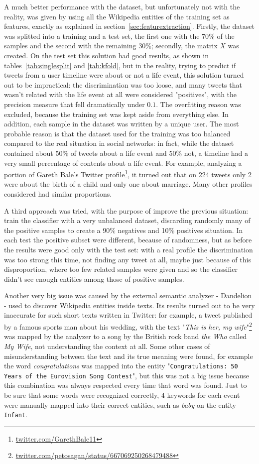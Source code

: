 A much better performance with the dataset, but unfortunately not with the reality, was given by using all the Wikipedia entities of the training set as features, exactly as explained in section~\ref{sec:featurextraction}. Firstly, the dataset was splitted into a training and a test set, the first one with the 70\% of the samples and the second with the remaining 30\%; secondly, the matrix $X$ was created. On the test set this solution had good results, as shown in tables~\ref{tab:singlesplit} and \ref{tab:kfold}, but in the reality, trying to predict if tweets from a user timeline were about or not a life event, this solution turned out to be impractical: the discrimination was too loose, and many tweets that wasn't related with the life event at all were considered "positives", with the precision measure that fell dramatically under $0.1$. The overfitting reason was excluded, because the training set was kept aside from everything else. In addition, each sample in the dataset was written by a unique user. The most probable reason is that the dataset used for the training was too balanced compared to the real situation in social networks: in fact, while the dataset contained about 50\% of tweets about a life event and 50\% not, a timeline had a very small percentage of contents about a life event. For example, analyzing a portion of Gareth Bale's Twitter profile\footnote{\url{twitter.com/GarethBale11}}, it turned out that on 224 tweets only 2 were about the birth of a child and only one about marriage. Many other profiles considered had similar proportions.

A third approach was tried, with the purpose of improve the previous situation: train the classifier with a very unbalanced dataset, discarding randomly many of the positive samples to create a 90\% negatives and 10\% positives situation. In each test the positive subset were different, because of randomness, but as before the results were good only with the test set: with a real profile the discrimination was too strong this time, not finding any tweet at all, maybe just because of this disproportion, where too few related samples were given and so the classifier didn't see enough entities among those of positive samples.

Another very big issue was caused by the external semantic analyzer - Dandelion - used to discover Wikipedia entities inside texts. Its results turned out to be very inaccurate for such short texts written in Twitter: for example, a tweet published by a famous sports man about his wedding, with the text "\textit{This is her, my wife}"\footnote{\url{twitter.com/petosagan/status/667069250268479488}} was mapped by the analyzer to a song by the British rock band \emph{the Who} called \emph{My Wife}, not understanding the context at all. Some other cases of misunderstanding between the text and its true meaning were found, for example the word \emph{congratulations} was mapped into the entity "\texttt{Congratulations: 50 Years of the Eurovision Song Contest}", but this was not a big issue because this combination was always respected every time that word was found. Just to be sure that some words were recognized correctly, 4 keywords for each event were manually mapped into their correct entities, such as \emph{baby} on the entity \texttt{Infant}.

